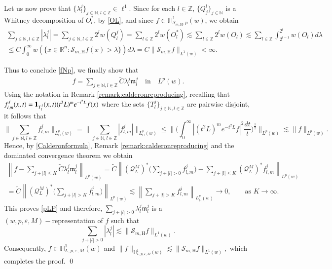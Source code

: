 \documentclass[11pt, a4paper,leqno]{amsart}
\newcommand{\mm}{\mathfrak{m}}
\renewcommand{\chi}{{\bf 1}}
\theoremstyle{plain}
\theoremstyle{definition}
\theoremstyle{remark}
\numberwithin{equation}{section}
\def \R{ \mathbb{R} }
\def \N{ \mathbb{N} }
\def \Z{ \mathbb{Z} }
\def \Scal{ \mathcal{S} }
\def \hh{ \mathrm{H} }
\def \p{ (w,p,\varepsilon,M)-\textrm{representation}}
\begin{document}
\medskip

Let us  now prove that $\{\lambda_l^j\}_{j\in \N,l\in \Z}\in \ell^1$. Since for each $l\in \Z$, $\{Q_j^l\}_{j\in \N}$ is a Whitney decomposition of $O_l^*$, by \eqref{OL}, and since $f\in \mathbb{H}_{\Scal_{m,\hh},p}^1(w)$,  we obtain
\begin{multline}\label{in-l1}
\sum_{j\in \N, l\in \Z}|\lambda_l^j|
=\sum_{j\in \N, l\in \Z}2^lw(Q_l^j)=\sum_{l\in \Z}2^lw(O_l^*)
\lesssim\sum_{l\in \Z}2^lw(O_l)
\lesssim \sum_{l\in \Z}\int_{2^{l-1}}^{2^{l}}w(O_l)d\lambda
\\
\leq C\int_{0}^{\infty}w(\{x\in \R^n:\Scal_{m,\hh} f(x)>\lambda\})d\lambda
=C \|\Scal_{m,\hh}f\|_{L^1(w)}<\infty.
\end{multline}


\medskip

Thus to conclude \eqref{fNp}, we finally  show that 
\begin{align}\label{pLP}
f=\sum_{j\in \N, l\in \Z}\widetilde{C}\lambda_l^j\mm_{l}^{j} \quad \textrm{in} \quad L^p(w).
\end{align}
Using the notation in Remark \ref{remark:calderonreproducing}, recalling that $f_{l,m}^j(x,t)=\chi_{T_l^j}(x,t)(t^2L)^me^{-t^2L}f(x)$ where the sets $\{T_l^j\}_{j\in \N, l\in \Z}$ are pairwise disjoint, it follows that 
$$
\Bigg\|\sum_{j\in \N, l\in \Z} f_{l,m}^j\Bigg\|_{L_\mathbb{H}^p(w)}
=
\Bigg\|\sum_{j\in \N, l\in \Z} |f_{l,m}^j|\Bigg\|_{L_\mathbb{H}^p(w)}
\le
\Bigg\|\Big(\int_0^\infty |(t^2L)^me^{-t^2L}f|^2\frac{dt}{t}\Big)^\frac12\Bigg\|_{L^p(w)}
\lesssim
\|f\|_{L^p(w)}.
$$
Hence, by \eqref{Calderonformula}, Remark \ref{remark:calderonreproducing} and the dominated convergence theorem we obtain
\begin{multline}\label{eqn:repre-Lpw-just}
\left\|f-\sum_{j+|l|\leq K}\widetilde{C}\lambda_{l}^j\mm_{l}^{j}\right\|_{L^p(w)}
=
\widetilde{C}\left\| (\mathcal{Q}_L^M)^*\Bigg(\sum_{j+|l|>0}f_{l,m}^j\Bigg)-\sum_{j+|l|\leq K}(\mathcal{Q}_L^M)^* f_{l,m}^j\right\|_{L^p(w)}
\\
=
\widetilde{C}\left\|(\mathcal{Q}_L^M)^*\Bigg(\sum_{j+|l|>K}f_{l,m}^j\Bigg)
\right\|_{L^p(w)}
\lesssim
\left\|\sum_{j+|l|>K}f_{l,m}^j
\right\|_{L_{\mathbb{H}}^p(w)}
\longrightarrow 0, \qquad\mbox{as } K\to \infty.
\end{multline}
This proves \eqref{pLP} and therefore, $\sum_{j+|l|>0}\lambda_l^j\mm_l^j$ is a $\p$ of $f$ such that 
$$
\sum_{j+|l|>0}|\lambda_l^j|\lesssim \|\Scal_{m,\hh}f\|_{L^1(w)}.
$$
Consequently, $f\in \mathbb{H}^1_{L,p,\varepsilon,M}(w)$ and
$
\|f\|_{\mathbb{H}_{L,p,\varepsilon,M}^1(w)}\lesssim \|\Scal_{m,\hh}f\|_{L^1(w)},
$
which completes the proof. \qed
\end{document}
